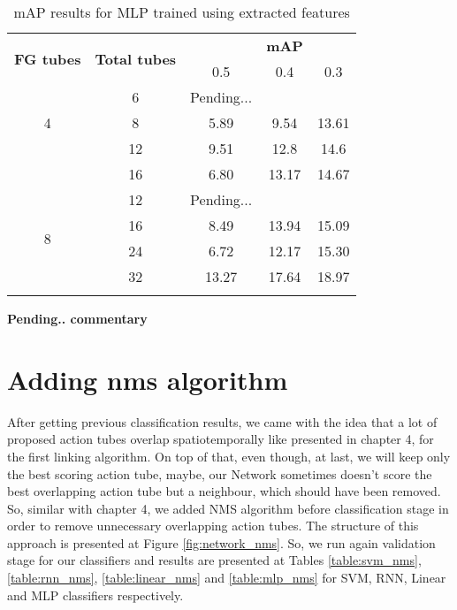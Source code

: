 \begin{center}
  \begin{longtable}{|| c | c || c c c ||}
    \hline
    \multirow{2}{*}{\textbf{FG tubes}} & \multirow{2}{*}{\textbf{Total tubes}} & {} & \textbf{mAP} & {} \\
    {} & {} & 0.5 & 0.4 & 0.3 \\
    \hline
    \multirow{3}{*}{4} & 6 & Pending...\\
    \cline{2-5}
    {} & 8 & 5.89 & 9.54 & 13.61 \\
    \cline{2-5}
    {} & 12 & 9.51 & 12.8 & 14.6  \\
    \cline{2-5}
    {} & 16 & 6.80 & 13.17 & 14.67 \\
    \hline
    \multirow{4}{*}{8} & 12 & Pending...\\
    \cline{2-5}
    {} & 16 & 8.49 & 13.94 & 15.09 \\
    \cline{2-5}
    {} & 24 & 6.72 & 12.17 & 15.30 \\
    \cline{2-5}
    {} & 32 & 13.27 & 17.64 & 18.97 \\
    \hline

  \caption{mAP results for MLP trained using extracted features}
  \label{table:mlp_extract_jhdmb}
\end{longtable}
\end{center}

\textbf{Pending.. commentary}

\section{Adding nms algorithm}

After getting previous classification results, we came with the idea that a lot of proposed action tubes overlap spatiotemporally like presented in chapter 4,
for the first linking algorithm. On top of that, even though, at last, we will keep only the best scoring action tube, maybe, our Network sometimes
doesn't score the best overlapping action tube but a neighbour, which should have been removed. So, similar with chapter 4, we added NMS algorithm
before classification stage in order to remove unnecessary overlapping action tubes.
The structure of this approach is presented at Figure \ref{fig:network_nms}. So, we run again validation stage for our classifiers
and results are presented at Tables \ref{table:svm_nms}, \ref{table:rnn_nms}, \ref{table:linear_nms} and \ref{table:mlp_nms} for SVM, RNN, Linear
and MLP classifiers respectively.

